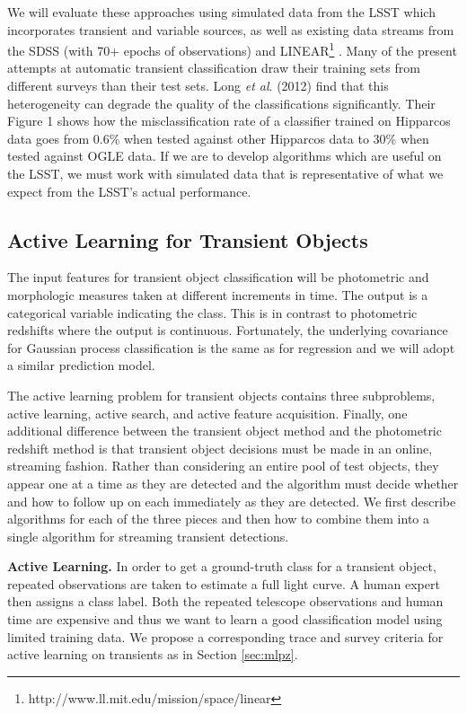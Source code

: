 \documentclass[prd, nofootinbib, floatfix, 12pt,tightenlines]{revtex4}
\begin{document}
We will evaluate these approaches using simulated data from the LSST
\cite{imsim} which incorporates transient and variable sources, as well as
existing data streams from the SDSS (with 70+ epochs of observations) and
LINEAR\footnote{http://www.ll.mit.edu/mission/space/linear} \cite{linear}.
Many of the present attempts at automatic transient classification
draw their training sets from different surveys than their test sets.  
Long {\it et al}. (2012) find that this heterogeneity can degrade the quality of
the classifications significantly.  Their Figure 1 shows how the
misclassification rate of a classifier trained on Hipparcos data goes from 0.6\%
when tested against other Hipparcos data to 30\% when tested against OGLE data. 
If we are to develop algorithms which are useful on the LSST, we must work with
simulated data that is representative of what we expect from the LSST's actual
performance.  

\subsection{Active Learning for Transient Objects}

The input features for transient object classification will be photometric
and morphologic measures taken at different increments in time.  The output
is a categorical variable indicating the class.  This is in contrast to
photometric redshifts where the output is continuous.  Fortunately, the
underlying covariance for Gaussian process classification is the same as
for regression and we will adopt a similar prediction model.

The active learning problem for transient objects contains three
subproblems, active learning, active search, and active feature
acquisition.  Finally, one additional difference between the transient
object method and the photometric redshift method is that transient object
decisions must be made in an online, streaming fashion.  Rather than
considering an entire pool of test objects, they appear one at a time as
they are detected and the algorithm must decide whether and how to follow
up on each immediately as they are detected.  We first describe algorithms
for each of the three pieces and then how to combine them into a single
algorithm for streaming transient detections.

{\bf Active Learning.} In order to get a ground-truth class for a transient
object, repeated observations are taken to estimate a full light curve.  A
human expert then assigns a class label.  Both the repeated telescope
observations and human time are expensive and thus we want to learn a good
classification model using limited training data.  We propose a
corresponding trace and survey criteria for active learning on transients
as in Section \ref{sec:mlpz}.
\end{document}
